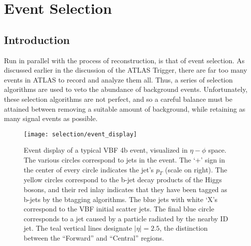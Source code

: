 \chapter{Event Selection} \label{chapter:selection}

\section{Introduction}

    Run in parallel with the process of reconstruction, is that of event selection.
    As discussed earlier in the discussion of the ATLAS Trigger,
        there are far too many events in ATLAS to record and analyze them all.
    Thus, a series of selection algorithms are used to veto the abundance of background events.
    Unfortunately, these selection algorithms are not perfect,
        and so a careful balance must be attained between removing a suitable amount of background,
        while retaining as many signal events as possible.

    \begin{figure}[tbh]
        \texttt{[image: selection/event\_display]}
        \caption{
            Event display of a typical VBF \to 4b event, visualized in $\eta-\phi$ space.
            The various circles correspond to jets in the event.
            The `+' sign in the center of every circle indicates the jet's $p_T$ (scale on right).
            The yellow circles correspond to the b-jet decay products of the Higgs bosons,
                and their red inlay indicates that they have been tagged as b-jets by the btagging algorithms.
            The blue jets with white `X's correspond to the VBF initial scatter jets.
            The final blue circle corresponds to a jet caused by a particle radiated by the nearby ID jet.
            The teal vertical lines designate $|\eta|=2.5$,
                the distinction between the ``Forward'' and ``Central'' regions.
        }
        \label{fig:event_display}
    \end{figure}

    
